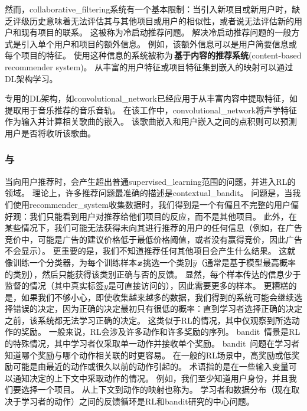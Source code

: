 然而，\gls{collaborative_filtering}系统有一个基本限制：当引入新项目或新用户时，缺乏评级历史意味着无法评估其与其他项目或用户的相似性，或者说无法评估新的用户和现有项目的联系。
这被称为冷启动推荐问题。
解决冷启动推荐问题的一般方式是引入单个用户和项目的额外信息。
例如，该额外信息可以是用户简要信息或每个项目的特征。
使用这种信息的系统被称为\,\textbf{基于内容的推荐系统}(content-based recommender system)。
从丰富的用户特征或项目特征集到嵌入的映射可以通过\gls{DL}架构学习\citep{Huang-et-al-2013,Elkahky-et-al-2015}。

专用的\gls{DL}架构，如\gls{convolutional_network}已经应用于从丰富内容中提取特征，如提取用于音乐推荐的音乐音轨\citep{vandenOord-et-al-NIPS2013}。
在该工作中，\gls{convolutional_network}将声学特征作为输入并计算相关歌曲的嵌入。
该歌曲嵌入和用户嵌入之间的点积则可以预测用户是否将收听该歌曲。


\subsubsection{与}
当向用户推荐时，会产生超出普通\gls{supervised_learning}范围的问题，并进入\gls{RL}的领域。
理论上，许多推荐问题最准确的描述是\gls{contextual_bandit}\citep{Langford+Zhang-NIPS2008,Lu-et-al-2010}。
问题是，当我们使用\gls{recommender_system}收集数据时，我们得到是一个有偏且不完整的用户偏好观：我们只能看到用户对推荐给他们项目的反应，而不是其他项目。
此外，在某些情况下，我们可能无法获得未向其进行推荐的用户的任何信息（例如，在广告竞价中，可能是广告的建议价格低于最低价格阈值，或者没有赢得竞价，因此广告不会显示）。
更重要的是，我们不知道推荐任何其他项目会产生什么结果。
这就像训练一个分类器，为每个训练样本$\boldsymbol{\mathit{x}}$挑选一个类别$\hat y$（通常是基于模型最高概率的类别），然后只能获得该类别正确与否的反馈。
显然，每个样本传达的信息少于监督的情况（其中真实标签$y$是可直接访问的），因此需要更多的样本。
更糟糕的是，如果我们不够小心，即使收集越来越多的数据，我们得到的系统可能会继续选择错误的决定，因为正确的决定最初只有很低的概率：直到学习者选择正确的决定之前，该系统都无法学习正确的决定。
这类似于\gls{RL}的情况，其中仅观察到所选动作的奖励。
一般来说，\gls{RL}会涉及许多动作和许多奖励的序列。
\gls{bandit}~情景是\gls{RL}的特殊情况，其中学习者仅采取单一动作并接收单个奖励。
\gls{bandit}~问题在学习者知道哪个奖励与哪个动作相关联的时更容易。
在一般的\gls{RL}场景中，高奖励或低奖励可能是由最近的动作或很久以前的动作引起的。
术语指的是在一些输入变量可以通知决定的上下文中采取动作的情况。
例如，我们至少知道用户身份，并且我们要选择一个项目。
从上下文到动作的映射也称为。
学习者和数据分布（现在取决于学习者的动作）之间的反馈循环是\gls{RL}和\gls{bandit}研究的中心问题。

